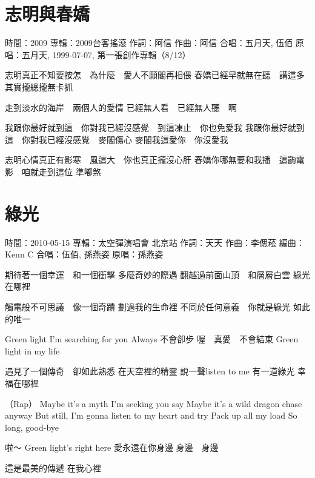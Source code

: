 \documentclass[UTF8,a4paper,oneside,twocolumn,12pt]{ctexbook}
\newcommand{\infopair}[2]{\textbullet #1：#2}
\newcommand{\zc}[1][伍佰]{\infopair{作詞}{#1}}
\newcommand{\zq}[1][伍佰]{\infopair{作曲}{#1}}
\newcommand{\bq}[1][伍佰]{\infopair{編曲}{#1}}
\newcommand{\zj}[1]{\infopair{專輯}{#1}}
\newcommand{\yc}[1]{\infopair{原唱}{#1}}
\newcommand{\sj}[1]{\infopair{時間}{#1}}
\newenvironment{info}{\begin{flushleft}\kaishu
	}
	{\end{flushleft}\normalsize\yahei\par}
\newenvironment{lyric}{
	}
{}
\begin{document}
\section{志明與春嬌}
\begin{info}
	\sj{2009}
	\zj{2009台客搖滾}
	\zc[阿信]
	\zq[阿信]
	\infopair{合唱}{五月天, 伍佰}
	\yc{五月天, 1999-07-07, 第一張創作專輯（8/12）}
\end{info}
\begin{lyric}
	志明真正不知要按怎　為什麼　愛人不願閣再相偎
	春嬌已經早就無在聽　講這多　其實攏總攏無卡抓

	走到淡水的海岸　兩個人的愛情
	已經無人看　已經無人聽　啊

	我跟你最好就到這　你對我已經沒感覺　到這凍止　你也免愛我
	我跟你最好就到這　你對我已經沒感覺　麥閣傷心
	麥閣我這愛你　你沒愛我

	志明心情真正有影寒　風這大　你也真正攏沒心肝
	春嬌你哪無要和我播　這齣電影　咱就走到這位  準嘟煞
\end{lyric}

\section{綠光}
\begin{info}
	\sj{2010-05-15}
	\zj{太空彈演唱會 北京站}
	\zc[天天]
	\zq[李偲菘]
	\bq[Kenn C]
	\infopair{合唱}{伍佰, 孫燕姿}
	\yc{孫燕姿}
\end{info}
\begin{lyric}
	期待著一個幸運　和一個衝擊
	多麼奇妙的際遇
	翻越過前面山頂　和層層白雲
	綠光在哪裡

	觸電般不可思議　像一個奇蹟
	劃過我的生命裡
	不同於任何意義　你就是綠光
	如此的唯一

	Green light   I'm searching for you
	Always   不會卻步
	喔　真愛　不會結束
	Green light in my life

	遇見了一個傳奇　卻如此熟悉
	在天空裡的精靈
	說一聲listen to me 有一道綠光
	幸福在哪裡

	（Rap）
	Maybe it's a myth I'm seeking you say
	Maybe it's a wild dragon chase anyway
	But still, I'm gonna listen to my heart and try
	Pack up all my load
	So long, good-bye

	啦～
	Green light's right here
	愛永遠在你身邊
	身邊　身邊

	這是最美的傳遞
	在我心裡
\end{lyric}
\end{document}
